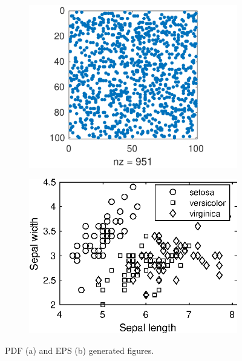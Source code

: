 	\begin{figure}[H]
		\centering
		\begin{subfigure}[b]{\twofig\textwidth} 
			\includegraphics{fig/spy.pdf}
		\end{subfigure}
		\hfil
		\begin{subfigure}[b]{\twofig\textwidth}
			\includegraphics{fig/gscatter.eps}
		\end{subfigure}
		\caption{PDF (a) and EPS (b) generated figures. \label{fig:math-stuff}}
	\end{figure}